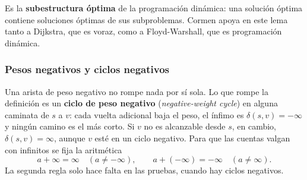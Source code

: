 \documentclass[11pt,letterpaper]{article}
\begin{document}
Es la \textbf{subestructura óptima} de la programación dinámica: una
solución óptima contiene soluciones óptimas de sus subproblemas.
Cormen apoya en este lema tanto a Dijkstra, que es voraz, como a
Floyd-Warshall, que es programación dinámica.

\subsubsection*{Pesos negativos y ciclos negativos}

Una arista de peso negativo no rompe nada por sí sola. Lo que rompe la
definición es un \textbf{ciclo de peso negativo}
(\textit{negative-weight cycle}) en alguna caminata de $s$ a $v$: cada
vuelta adicional baja el peso, el ínfimo es $\delta(s, v) = -\infty$ y
ningún camino es el más corto. Si $v$ no es alcanzable desde $s$, en
cambio, $\delta(s, v) = \infty$, aunque $v$ esté en un ciclo negativo.
Para que las cuentas valgan con infinitos se fija la aritmética
\[
  a + \infty = \infty \quad (a \neq -\infty) , \qquad
  a + (-\infty) = -\infty \quad (a \neq \infty) .
\]
La segunda regla solo hace falta en las pruebas, cuando hay ciclos
negativos.
\end{document}
